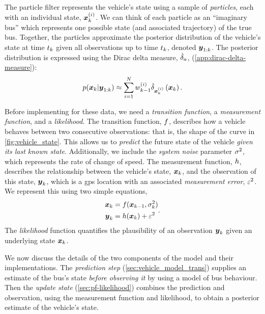 The particle filter represents the vehicle's state using a sample of \emph{particles}, each with an individual state, $\boldsymbol x_k^{(i)}$. We can think of each particle as an ``imaginary bus'' which represents one possible state (and associated trajectory) of the true bus. Together, the particles approximate the posterior distribution of the vehicle's state at time $t_k$ given all observations up to time $t_k$, denoted $\boldsymbol{y}_{1:k}$. The posterior distribution is expressed using the Dirac delta measure, $\dot\delta_a$, (\cref{app:dirac-delta-measure}):
\begin{equation}
\label{eq:vehicle_state_dirac}
p(\boldsymbol x_k | \boldsymbol{y}_{1:k}) \approx
\sum_{i=1}^N w^{(i)}_{k-1} \dot\delta_{\boldsymbol x_k^{(i)}}\left(\boldsymbol x_k\right).
\end{equation}

Before implementing  for these data, we need a \emph{transition function}, a \emph{measurement function}, and a \emph{likelihood}. The transition function, $f$, describes how a vehicle behaves between two consecutive observations: that is, the shape of the curve in \cref{fig:vehicle_state}. This allows us to \emph{predict} the future state of the vehicle \emph{given its last known state}. Additionally, we include the \emph{system noise} parameter $\sigma^2$, which represents the rate of change of speed. The measurement function, $h$, describes the relationship between the vehicle's state, $\boldsymbol x_k$, and the observation of this state, $\boldsymbol{y}_k$, which is a \gls{gps} location with an associated \emph{measurement error}, $\varepsilon^2$. We represent this using two simple equations,
\begin{equation}
\label{eq:vehicle_model}
\begin{split}
\boldsymbol x_k &= f(\boldsymbol x_{k-1}, \sigma^2_k) \\
\boldsymbol{y}_k &= h(\boldsymbol x_k) + \varepsilon^2
\end{split}.
\end{equation}
The \emph{likelihood} function quantifies the plausibility of an observation $\boldsymbol{y}_k$ given an underlying state $\boldsymbol x_k$.


We now discuss the details of the two components of the model and their implementations. The \emph{prediction step} (\cref{sec:vehicle_model_trans}) supplies an estimate of the bus's state \emph{before observing it} by using a model of bus behaviour. Then the \emph{update state} (\cref{sec:pf-likelihood}) combines the prediction and observation, using the measurement function and likelihood, to obtain a posterior estimate of the vehicle's state.
